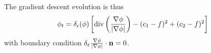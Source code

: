 The gradient descent evolution is thus 
\begin{align*}
\phi_t 
= \delta_\epsilon(\phi) \left[ 
\operatorname{div}\left(\frac{\nabla \phi}{\lvert\nabla \phi\rvert} \right) - (c_1 - f)^2 + (c_2 - f)^2 
\right]
\end{align*}
with boundary condition $\delta_\varepsilon 
\frac{\nabla \phi}{\lvert\nabla \phi\rvert} \cdot \mathbf{n} = 0$.





